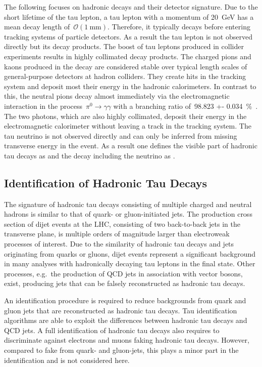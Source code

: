 The following focuses on hadronic decays and their detector signature. Due to
the short lifetime of the tau lepton, a tau lepton with a momentum of
\SI{20}{\GeV} has a mean decay length of~$\mathcal{O}(\SI{1}{\milli\metre})$.
Therefore, it typically decays before entering tracking systems of particle
detectors. As a result the tau lepton is not observed directly but its decay
products. The boost of tau leptons produced in collider experiments results in
highly collimated decay products. The charged pions and kaons produced in the
decay are considered stable over typical length scales of general-purpose
detectors at hadron colliders. They create hits in the tracking system and
deposit most their energy in the hadronic calorimeters. In contrast to this, the
neutral pions decay almost immediately via the electromagnetic interaction in
the process~\mbox{$\pi^0 \to \gamma\gamma$} with a branching ratio of~\SI{98.823
  +- 0.034}{\percent}~\cite{pdg}. The two photons, which are also highly
collimated, deposit their energy in the electromagnetic calorimeter without
leaving a track in the tracking system. The tau neutrino is not observed
directly and can only be inferred from missing transverse energy in the event.
As a result one defines the visible part of hadronic tau decays as \tauhadvis
and the decay including the neutrino as \tauhad.

\subsection{Identification of Hadronic Tau Decays}
\label{sec:features_tau_decay}

The signature of hadronic tau decays consisting of multiple charged and neutral
hadrons is similar to that of quark- or gluon-initiated jets. The production
cross section of dijet events at the LHC, consisting of two back-to-back jets in
the transverse plane, is multiple orders of magnitude larger than electroweak
processes of interest. Due to the similarity of hadronic tau decays and jets
originating from quarks or gluons, dijet events represent a significant
background in many analyses with hadronically decaying tau leptons in the final
state. Other processes, e.g.\ the production of QCD jets in association with
vector bosons, exist, producing jets that can be falsely reconstructed as
hadronic tau decays.

An identification procedure is required to reduce backgrounds from quark and
gluon jets that are reconstructed as hadronic tau decays. Tau identification
algorithms are able to exploit the differences between hadronic tau decays and
QCD jets. A full identification of hadronic tau decays also requires to
discriminate against electrons and muons faking hadronic tau decays. However,
compared to fake \tauhad from quark- and gluon-jets, this plays a minor part in
the identification and is not considered here.

